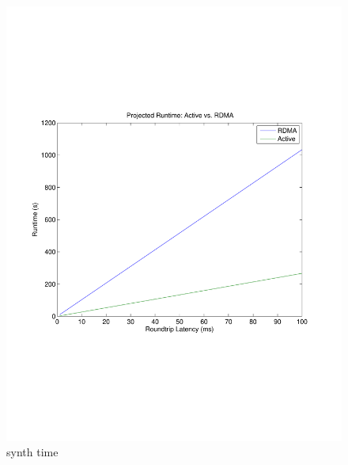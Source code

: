 \documentclass[10pt]{article}
\begin{document}
\begin{itemize}
\begin{itemize}
\begin{figure}
  \centering
\includegraphics[scale=0.5, trim = 0 200 0 200]{../../results/matlab/synth_time.pdf}
  \caption{synth time}\label{synth_time}
\end{figure}


\end{itemize}
\end{itemize}
\end{document}

